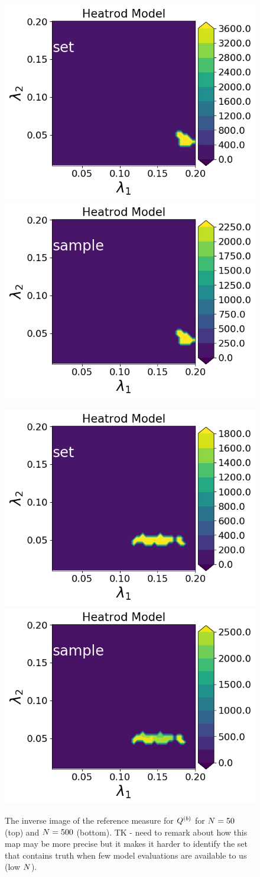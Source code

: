 \begin{figure}
\includegraphics[width=.45\linewidth]{examples/fig_heatrod_q2/HeatrodModel--set_N50_em.png}
\includegraphics[width=.45\linewidth]{examples/fig_heatrod_q2/HeatrodModel--sample_N50_mc.png}

\includegraphics[width=.45\linewidth]{examples/fig_heatrod_q2/HeatrodModel--set_N500_em.png}
\includegraphics[width=.45\linewidth]{examples/fig_heatrod_q2/HeatrodModel--sample_N500_mc.png}

\caption{The inverse image of the reference measure for $Q^{(b)}$ for $N = 50$ (top) and $N = 500$ (bottom). TK - need to remark about how this map may be more precise but it makes it harder to identify the set that contains truth when few model evaluations are available to us (low $N$). }
\label{fig:heatrod-convergence-b}
\end{figure}


